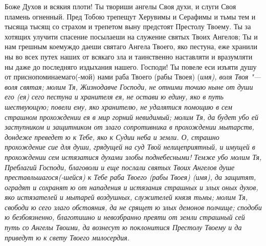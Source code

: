 Боже Духов и всякия плоти! Ты твориши ангелы Своя духи, и слуги Своя пламень огненный. Пред Тобою трепещут Херувимы и Серафимы и тьмы тем и тысяща тысящ со страхом и трепетом выну предстоят Престолу Твоему. Ты за хотящих улучити спасение посылаеши на служение святых Твоих Ангелов; Ты и нам грешным коемуждо даеши святаго Ангела Твоего, яко пестуна, еже хранили ны во всех путех наших от всякаго зла и таинственно наставляти и вразумляти ны даже до последняго издыхания нашего. Господи! Ты повеле еси изъяти душу от приснопоминаемаго(-мой) нами раба Твоего (рабы Твоея) (\itshape имя\normalfont{}), воля Твоя "--- воля святая; молим Тя, Жизнодавче Господи, не отними точию ныне от души его (ея) сего пестуна и хранителя ея, не остави ю едину, яко в путь шествующую; повели ему, яко хранителю, не удалятися помощию в сем страшном прохождении ея в мир горний невидимый; молим Тя, да будет убо ей заступником и защитником от злаго сопротивника в прохождении мытарств, дондеже преведет ю к Тебе, яко к Судии неба и земли. О, страшно прохождение сие для души, грядущей на суд Твой нелицеприятный, и имущей в прохождении сем истязатися духами злобы поднебесными! Темже убо молим Тя, Преблагий Господи, благоволи и еще послали святых Твоих Ангелов душе преставльшагося(-шейся) к Тебе раба Твоего (рабы Твоея) (\itshape имя\normalfont{}), да защитят, оградят и сохранят ю от нападения и истязания страшных и злых оных духов, яко истязателей и мытарей воздушных, служителей князя тьмы; молим Тя, свободи ю сего злаго обстояния, да не срящет ю злых демонов полчище; сподоби ю безбоязненно, благотишно и невозбранно преяти от земли страшный сей путь со Ангелы Твоими, да вознесут ю поклонитися  Престолу Твоему и да приведут ю к свету Твоего милосердия.


\mychapterending




\medskip



